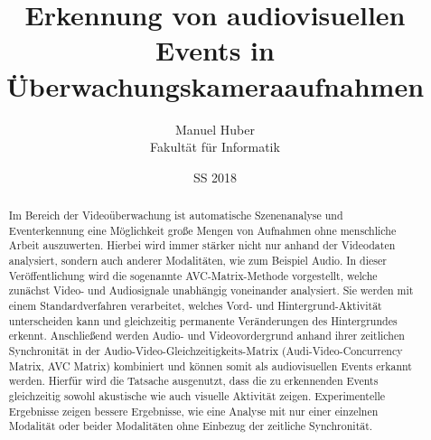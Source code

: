 \documentclass[twoside=true, %
    DIV=11,%
    BCOR=15mm, %
    headinclude=true,
    footinclude=false,
    pagesize,%
    fontsize=11pt,%
    paper=a4,%
    numbers=noenddot
  ]{scrartcl}
\begin{document}
\def\figdir{figures}
\def\tabledir{tables}

\titlehead{
\raggedleft
\texttt{[image: \\figdir/HS\_Logo\_aktuell\_CMYK.eps]}
}

\title{
\vspace*{-1cm}
Erkennung von audiovisuellen Events in Überwachungskameraaufnahmen
}

\author{
Manuel Huber\\
Fakultät für Informatik}

\date{SS 2018}

\maketitle

\begin{abstract}
Im Bereich der Videoüberwachung ist automatische Szenenanalyse und Eventerkennung eine Möglichkeit große Mengen von Aufnahmen ohne menschliche Arbeit auszuwerten. Hierbei wird immer stärker nicht nur anhand der Videodaten analysiert, sondern auch anderer Modalitäten, wie zum Beispiel Audio. In dieser Veröffentlichung wird die sogenannte AVC-Matrix-Methode vorgestellt, welche zunächst Video- und Audiosignale unabhängig voneinander analysiert. Sie werden mit einem Standardverfahren verarbeitet, welches Vord- und Hintergrund-Aktivität unterscheiden kann und gleichzeitig permanente Veränderungen des Hintergrundes erkennt. Anschließend werden Audio- und Videovordergrund anhand ihrer zeitlichen Synchronität in der Audio-Video-Gleichzeitigkeits-Matrix (Audi-Video-Concurrency Matrix, AVC Matrix) kombiniert und können somit als audiovisuellen Events erkannt werden. Hierfür wird die Tatsache ausgenutzt, dass die zu erkennenden Events gleichzeitig sowohl akustische wie auch visuelle Aktivität zeigen. Experimentelle Ergebnisse zeigen bessere Ergebnisse, wie eine Analyse mit nur einer einzelnen Modalität oder beider Modalitäten ohne Einbezug der zeitliche Synchronität.
\end{abstract}

\tableofcontents











% 




\end{document}

